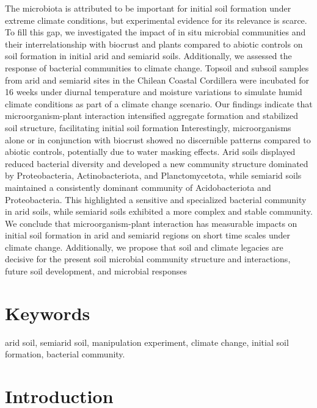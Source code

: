 The microbiota is attributed to be important for initial soil formation under extreme climate conditions, but experimental evidence for its relevance is scarce. To fill this gap, we investigated the impact of in situ microbial communities and their interrelationship with biocrust and plants compared to abiotic controls on soil formation in initial arid and semiarid soils. Additionally, we assessed the response of bacterial communities to climate change. Topsoil and subsoil samples from arid and semiarid sites in the Chilean Coastal Cordillera were incubated for 16 weeks under diurnal temperature and moisture variations to simulate humid climate conditions as part of a climate change scenario. Our findings indicate that microorganism-plant interaction intensified aggregate formation and stabilized soil structure, facilitating initial soil formation Interestingly, microorganisms alone or in conjunction with biocrust showed no discernible patterns compared to abiotic controls, potentially due to water masking effects. Arid soils displayed reduced bacterial diversity and developed a new community structure dominated by Proteobacteria, Actinobacteriota, and Planctomycetota, while semiarid soils maintained a consistently dominant community of Acidobacteriota and Proteobacteria. This highlighted a sensitive and specialized bacterial community in arid soils, while semiarid soils exhibited a more complex and stable community. We conclude that microorganism-plant interaction has measurable impacts on initial soil formation in arid and semiarid regions on short time scales under climate change. Additionally, we propose that soil and climate legacies are decisive for the present soil microbial community structure and interactions, future soil development, and microbial responses 

\section*{Keywords} %

arid soil, semiarid soil, manipulation experiment, climate change, initial soil formation,
bacterial community.

\section{Introduction}
\label{sec:introduction}

